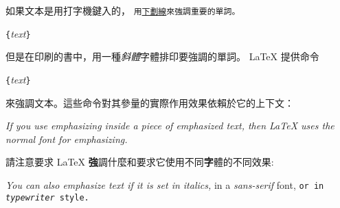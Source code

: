 如果文本是用打字機鍵入的，
\texttt{用\underline{下劃線}來強調重要的單詞。}
\begin{lscommand}
\verb|{|\emph{text}\verb|}|
\end{lscommand}
但是在印刷的書中，用一種\emph{斜體}字體排印要強調的單詞。
\LaTeX{} 提供命令
\begin{lscommand}
\verb|{|\emph{text}\verb|}|
\end{lscommand}
\noindent
來強調文本。這些命令對其參量的實際作用效果依賴於它的上下文：

\begin{example}
\emph{If you use
  emphasizing inside a piece
  of emphasized text, then
  \LaTeX{} uses the
  \emph{normal} font for
  emphasizing.}
\end{example}

請注意要求 \LaTeX{} {\textbf 強調}什麼和要求它使用不同{\textbf
字體}的不同效果:

\begin{example}
\textit{You can also
  \emph{emphasize} text if
  it is set in italics,}
\textsf{in a
  \emph{sans-serif} font,}
\texttt{or in
  \emph{typewriter} style.}
\end{example}

